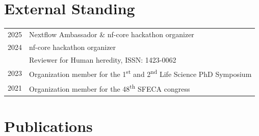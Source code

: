 \documentclass[11pt,a4paper]{moderncv}
\begin{document}
\section{External Standing}
\begin{tabularx}{\textwidth}{p{} X}
    2025 & Nextflow Ambassador \& nf-core hackathon organizer \\
    2024 & nf-core hackathon organizer \\
    & Reviewer for Human heredity, ISSN: 1423-0062 \\
    2023 & Organization member for the 1\textsuperscript{st} and 2\textsuperscript{nd} Life Science PhD Symposium \\
    2021 & Organization member for the 48\textsuperscript{th} SFECA congress \\
\end{tabularx}

\section{Publications}
\end{document}
